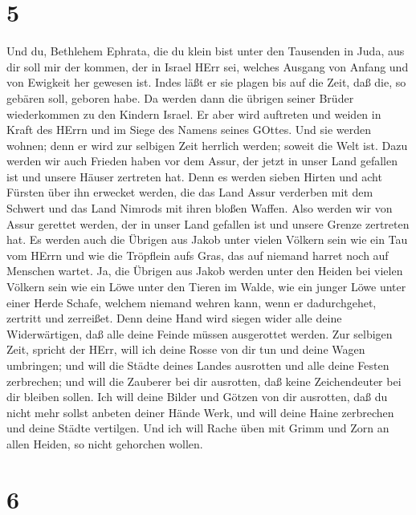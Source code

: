 \hypertarget{section-4}{%
\section{5}\label{section-4}}

 Und du, Bethlehem Ephrata, die du klein bist unter den
Tausenden in Juda, aus dir soll mir der kommen, der in Israel HErr sei,
welches Ausgang von Anfang und von Ewigkeit her gewesen ist.
 Indes läßt er sie plagen bis auf die Zeit, daß die, so
gebären soll, geboren habe. Da werden dann die übrigen seiner Brüder
wiederkommen zu den Kindern Israel.  Er aber wird auftreten
und weiden in Kraft des HErrn und im Siege des Namens seines GOttes. Und
sie werden wohnen; denn er wird zur selbigen Zeit herrlich werden;
soweit die Welt ist.  Dazu werden wir auch Frieden haben vor
dem Assur, der jetzt in unser Land gefallen ist und unsere Häuser
zertreten hat. Denn es werden sieben Hirten und acht Fürsten über ihn
erwecket werden,  die das Land Assur verderben mit dem
Schwert und das Land Nimrods mit ihren bloßen Waffen. Also werden wir
von Assur gerettet werden, der in unser Land gefallen ist und unsere
Grenze zertreten hat.  Es werden auch die Übrigen aus Jakob
unter vielen Völkern sein wie ein Tau vom HErrn und wie die Tröpflein
aufs Gras, das auf niemand harret noch auf Menschen wartet. 
Ja, die Übrigen aus Jakob werden unter den Heiden bei vielen Völkern
sein wie ein Löwe unter den Tieren im Walde, wie ein junger Löwe unter
einer Herde Schafe, welchem niemand wehren kann, wenn er dadurchgehet,
zertritt und zerreißet.  Denn deine Hand wird siegen wider
alle deine Widerwärtigen, daß alle deine Feinde müssen ausgerottet
werden.  Zur selbigen Zeit, spricht der HErr, will ich deine
Rosse von dir tun und deine Wagen umbringen;  und will die
Städte deines Landes ausrotten und alle deine Festen zerbrechen;
 und will die Zauberer bei dir ausrotten, daß keine
Zeichendeuter bei dir bleiben sollen.  Ich will deine
Bilder und Götzen von dir ausrotten, daß du nicht mehr sollst anbeten
deiner Hände Werk,  und will deine Haine zerbrechen und
deine Städte vertilgen.  Und ich will Rache üben mit Grimm
und Zorn an allen Heiden, so nicht gehorchen wollen.

\hypertarget{section-5}{%
\section{6}\label{section-5}}

